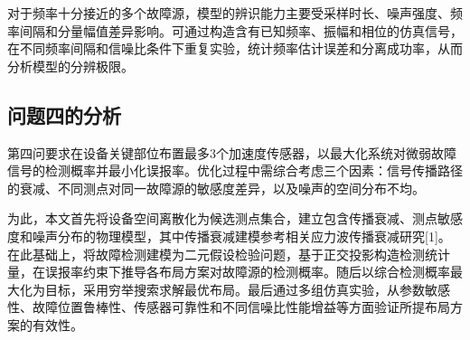 \documentclass[UTF8,a4paper,12pt]{ctexart}
\numberwithin{figure}{section}
\numberwithin{table}{section}
\begin{document}
对于频率十分接近的多个故障源，模型的辨识能力主要受采样时长、噪声强度、频率间隔和分量幅值差异影响。可通过构造含有已知频率、振幅和相位的仿真信号，在不同频率间隔和信噪比条件下重复实验，统计频率估计误差和分离成功率，从而分析模型的分辨极限。

\subsection{问题四的分析}
第四问要求在设备关键部位布置最多3个加速度传感器，以最大化系统对微弱故障信号的检测概率并最小化误报率。优化过程中需综合考虑三个因素：信号传播路径的衰减、不同测点对同一故障源的敏感度差异，以及噪声的空间分布不均。

为此，本文首先将设备空间离散化为候选测点集合，建立包含传播衰减、测点敏感度和噪声分布的物理模型，其中传播衰减建模参考相关应力波传播衰减研究[1]。在此基础上，将故障检测建模为二元假设检验问题，基于正交投影构造检测统计量，在误报率约束下推导各布局方案对故障源的检测概率。随后以综合检测概率最大化为目标，采用穷举搜索求解最优布局。最后通过多组仿真实验，从参数敏感性、故障位置鲁棒性、传感器可靠性和不同信噪比性能增益等方面验证所提布局方案的有效性。
\end{document}
